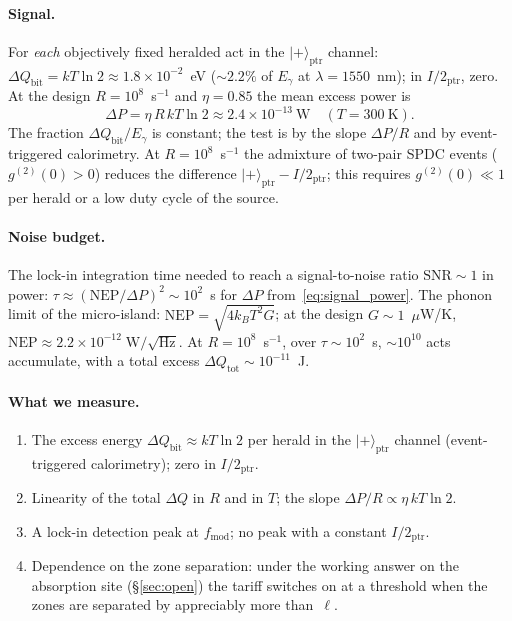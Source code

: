 \documentclass[11pt,a4paper]{article}
\newcommand{\Sref}[1]{\hyperref[#1]{\S\ref{#1}}}
\begin{document}
\paragraph{Signal.}
For \emph{each} objectively fixed heralded act in the $|{+}\rangle_{\mathrm{ptr}}$ channel:
$\Delta Q_{\mathrm{bit}} = kT\ln 2 \approx 1.8\times 10^{-2}$~eV ($\sim 2.2\%$ of $E_\gamma$ at $\lambda=1550$~nm); in $I/2_{\mathrm{ptr}}$, zero. At the design $R=10^{8}$~s$^{-1}$ and $\eta=0.85$ the mean excess power is
\begin{equation}
\Delta P = \eta\, R\, kT\ln 2
\approx 2.4\times 10^{-13}~\text{W}
\quad (T=300~\text{K}).
\label{eq:signal_power}
\end{equation}
The fraction $\Delta Q_{\mathrm{bit}}/E_\gamma$ is constant; the test is by the slope $\Delta P/R$ and by event-triggered calorimetry. At $R=10^{8}$~s$^{-1}$ the admixture of two-pair SPDC events ($g^{(2)}(0)>0$) reduces the difference $|{+}\rangle_{\mathrm{ptr}}-I/2_{\mathrm{ptr}}$; this requires $g^{(2)}(0)\ll 1$ per herald or a low duty cycle of the source.

\paragraph{Noise budget.}
The lock-in integration time needed to reach a signal-to-noise ratio $\mathrm{SNR}\sim 1$ in power: $\tau\approx(\mathrm{NEP}/\Delta P)^2\sim 10^{2}$~s for $\Delta P$ from~\eqref{eq:signal_power}. The phonon limit of the micro-island: $\mathrm{NEP}=\sqrt{4k_BT^2G}$; at the design $G\sim 1$~$\mu$W/K, $\mathrm{NEP}\approx 2.2\times 10^{-12}\;\textrm{W}/\sqrt{\textrm{Hz}}$. At $R=10^{8}$~s$^{-1}$, over $\tau\sim 10^{2}$~s, $\sim 10^{10}$ acts accumulate, with a total excess $\Delta Q_{\mathrm{tot}}\sim 10^{-11}$~J.

\paragraph{What we measure.}
\begin{enumerate}
\item The excess energy $\Delta Q_{\mathrm{bit}} \approx kT\ln 2$ per herald in the $|{+}\rangle_{\mathrm{ptr}}$ channel (event-triggered calorimetry); zero in $I/2_{\mathrm{ptr}}$.
\item Linearity of the total $\Delta Q$ in $R$ and in $T$; the slope $\Delta P/R \propto \eta\,kT\ln 2$.
\item A lock-in detection peak at $f_{\mathrm{mod}}$; no peak with a constant $I/2_{\mathrm{ptr}}$.
\item Dependence on the zone separation: under the working answer on the absorption site (\Sref{sec:open}) the tariff switches on at a threshold when the zones are separated by appreciably more than~$\ell$.
\end{enumerate}
\end{document}
